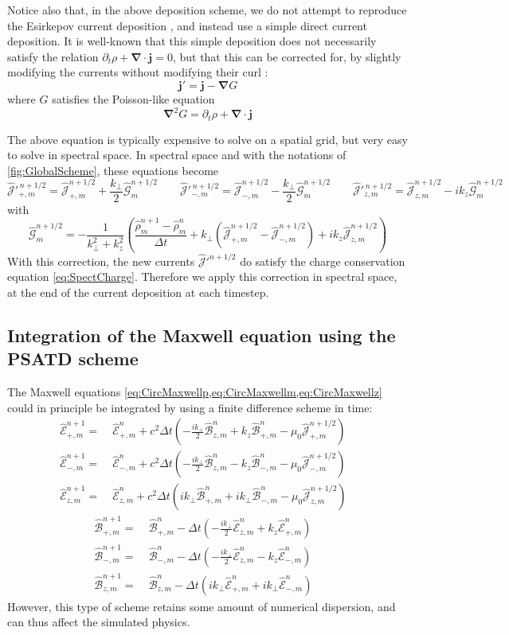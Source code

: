 \documentclass[1p,times,authoryear]{elsarticle}
\newcommand{\tB}[2]{\spectral{B}_{#1,m}^{#2}}
\newcommand{\tE}[2]{\spectral{E}_{#1,m}^{#2}}
\newcommand{\tj}[2]{\spectral{J}_{#1,m}^{#2}}
\renewcommand{\vec}[1]{\boldsymbol{#1}}
\newcommand{\spectral}[1]{\hat{\mathcal{#1}}}
\begin{document}
Notice also that, in the above deposition scheme, we do not attempt to
reproduce the Esirkepov current deposition \citep{Esirkepov}, and instead use a
simple direct current deposition. It is well-known that this simple deposition does not necessarily
satisfy the relation $\partial_t\rho + \vec{\nabla}\cdot\vec{j} =
0$, but that this can be corrected for, by slightly modifying the
currents without modifying their curl \citep{VayJCP2013}:
\[ \vec{j}' = \vec{j} - \vec{\nabla} G \]
where $G$ satisfies the Poisson-like equation
\[ \vec{\nabla}^2 G = \partial_t\rho + \vec{\nabla}\cdot\vec{j} \]

The above equation is typically expensive to solve on a spatial grid, but
very easy to solve in spectral space. In spectral space and with the
notations of \cref{fig:GlobalScheme}, these equations become
\[ \spectral{J}'^{\,n+1/2}_{+,m} = \spectral{J}^{n+1/2}_{+,m} +
\frac{k_\perp}{2} \spectral{G}^{n+1/2}_m
\qquad
\spectral{J}'^{\,n+1/2}_{-,m} = \spectral{J}^{n+1/2}_{-,m} - \frac{k_\perp}{2} \spectral{G}^{n+1/2}_m
\qquad \spectral{J}'^{\,n+1/2}_{z,m} = \spectral{J}^{n+1/2}_{z,m} - ik_z
\spectral{G}^{n+1/2}_m\]
with
\[ \spectral{G}^{n+1/2}_m = - \frac{1}{k_\perp^2 + k_z^2}\left(
  \frac{\spectral{\rho}^{n+1}_m -\spectral{\rho}^{n}_m}{\Delta t} + k_\perp
  (\spectral{J}^{n+1/2}_{+,m} -\spectral{J}^{n+1/2}_{-,m}) + ik_z\spectral{J}^{n+1/2}_{z,m}  \right) \]
With this correction, the new currents $\spectral{J}'^{n+1/2}$ do satisfy
the charge conservation equation \cref{eq:SpectCharge}. Therefore we apply this
correction in spectral space, at the end of the current deposition at each timestep.

\subsection{Integration of the Maxwell equation using the PSATD scheme}
\label{sec:FieldIntegration}

The Maxwell equations
\cref{eq:CircMaxwellp,eq:CircMaxwellm,eq:CircMaxwellz} could in
principle be integrated by using a finite difference scheme in time:
\begin{align*}
\tE{+}{n+1} = \; & \tE{+}{n} + 
c^2\Delta t\left(-\frac{ik_\perp }{2} \tB{z}{n} + k_z\tB{+}{n}
- \mu_0 \tj{+}{n+1/2} \right) & \\
\tE{-}{n+1} =\; & \tE{-}{n} +
c^2\Delta t\left(- \frac{ik_\perp }{2} \tB{z}{n} - k_z\tB{-}{n}
- \mu_0 \tj{-}{n+1/2} \right) &\\
\tE{z}{n+1} =\; & \tE{z}{n} + 
c^2\Delta t\left(ik_\perp \tB{+}{n} + ik_\perp \tB{-}{n}
- \mu_0 \tj{z}{n+1/2} \right)  &
\end{align*}
\begin{align*}
\tB{+}{n+1} = \; & \tB{+}{n} - 
\Delta t\left(-\frac{ik_\perp }{2} \tE{z}{n} + k_z\tE{+}{n}
\right) & \\
\tB{-}{n+1} =\; & \tB{-}{n} - 
\Delta t\left(- \frac{ik_\perp }{2} \tE{z}{n} - k_z\tE{-}{n}
\right) &\\
\tB{z}{n+1} =\; & \tB{z}{n} - 
\Delta t\left(ik_\perp \tE{+}{n} + ik_\perp \tE{-}{n}
\right) &
\end{align*}
However, this type of scheme retains some amount of numerical dispersion, and can
thus affect the simulated physics.
\end{document}
